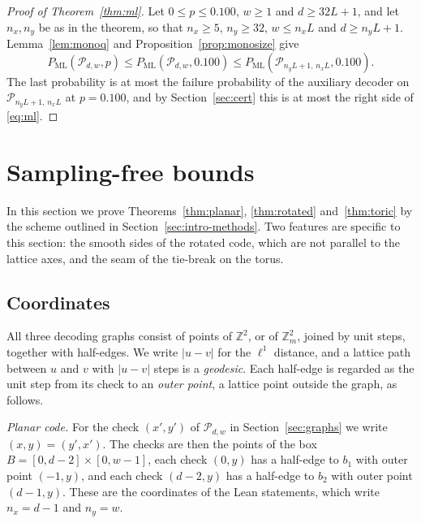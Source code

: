 \documentclass[11pt]{amsart}
\theoremstyle{definition}
\theoremstyle{remark}
\numberwithin{equation}{section}
\newcommand{\PML}{P_{\mathrm{ML}}}
\begin{document}
\begin{proof}[Proof of Theorem~\ref{thm:ml}]
Let $0\le p\le0.100$, $w\ge1$ and $d\ge32L+1$, and let $n_x,n_y$ be as in the theorem, so that $n_x\ge5$, $n_y\ge32$, $w\le n_xL$ and $d\ge n_yL+1$. Lemma~\ref{lem:monoq} and Proposition~\ref{prop:monosize} give
\[
\PML(\mathcal P_{d,w},p)\le\PML(\mathcal P_{d,w},0.100)\le\PML(\mathcal P_{n_yL+1,\,n_xL},0.100).
\]
The last probability is at most the failure probability of the auxiliary decoder on $\mathcal P_{n_yL+1,\,n_xL}$ at $p=0.100$, and by Section~\ref{sec:cert} this is at most the right side of \eqref{eq:ml}.
\end{proof}

\section{Sampling-free bounds}\label{sec:count}

In this section we prove Theorems~\ref{thm:planar}, \ref{thm:rotated} and~\ref{thm:toric} by the scheme outlined in
Section~\ref{sec:intro-methods}. Two features are specific to this section: the smooth sides of the rotated code, which are not
parallel to the lattice axes, and the seam of the tie-break on the torus.

\subsection{Coordinates}\label{cnt:coord}
All three decoding graphs consist of points of $\mathbb Z^2$, or of $\mathbb Z_m^2$, joined by unit steps, together
with half-edges. We write $|u-v|$ for the $\ell^1$ distance, and a lattice path between $u$ and $v$ with $|u-v|$
steps is a \emph{geodesic}. Each half-edge is regarded as the unit step from its check to an \emph{outer point}, a
lattice point outside the graph, as follows.

\emph{Planar code.} For the check $(x',y')$ of $\mathcal P_{d,w}$ in Section~\ref{sec:graphs} we write
$(x,y)=(y',x')$. The checks are then the points of the box $B=[0,d-2]\times[0,w-1]$, each check $(0,y)$ has a
half-edge to $b_1$ with outer point $(-1,y)$, and each check $(d-2,y)$ has a half-edge to $b_2$ with outer point
$(d-1,y)$. These are the coordinates of the Lean statements, which write $n_x=d-1$ and $n_y=w$.
\end{document}
